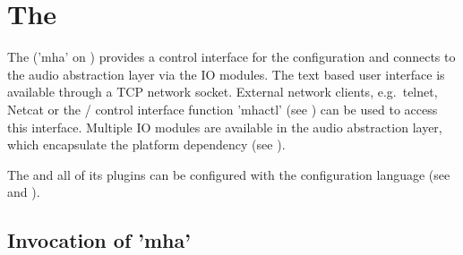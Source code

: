 

\section{The \mhad{}}\label{sec:linuxmhaserver}\label{sec:frameworks}

The \mhad{} ('mha' on \Linux{}) provides a control interface for 
the configuration and connects to the audio abstraction layer via the \mhad{} IO modules.
%
The text based user interface is available through a TCP network
socket.
%
External network clients, e.g.\ telnet, Netcat or the \Octave{}/\Matlab{} control
interface function 'mhactl' (see ) can be used
to access this interface.
%
Multiple IO modules are available in the audio abstraction layer,
which encapsulate the platform dependency (see
).
%

The \mhad{} and all of its plugins can be configured with the \mha{}
configuration language (see  and ).
%


\subsection{Invocation of 'mha'}

